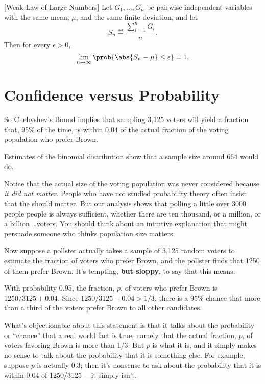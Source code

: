 \begin{corollary}\label{weaklaw}[Weak Law of Large Numbers]
  Let $G_1, \dots, G_n$ be pairwise independent variables with the same
  mean, $\mu$, and the same finite deviation, and let
\[
S_n \eqdef \frac{\sum_{i=1}^n G_i}{n}.
\]
Then for every $\epsilon > 0$,
\[
\lim_{n \rightarrow \infty}
        \prob{\abs{S_n - \mu}  \leq \epsilon} = 1.
\]
\end{corollary}

\section{Confidence versus Probability}

So Chebyshev's Bound implies that sampling 3,125 voters will yield a
fraction that, 95\% of the time, is within 0.04 of the actual fraction
of the voting population who prefer Brown.  \begin{editingnotes}
  Estimates of the binomial distribution show that a sample size
  around 664 would do.
\end{editingnotes}

Notice that the actual size of the voting population was never
considered because \emph{it did not matter}.  People who have not
studied probability theory often insist that the 
should matter.  But our analysis shows that polling a little over 3000
people people is always sufficient, whether there are ten thousand, or
a million, or a billion \dots voters.  You should think about an intuitive
explanation that might persuade someone who thinks population size
matters.

Now suppose a pollster actually takes a sample of 3,125 random voters to
estimate the fraction of voters who prefer Brown, and the pollster finds
that 1250 of them prefer Brown.  It's tempting, \textbf{but sloppy}, to
say that this means:
\begin{falseclm*}
  With probability 0.95, the fraction, $p$, of voters who prefer Brown
  is $1250/3125 \pm 0.04$.  Since $1250/3125 -0.04 > 1/3$, there is a 95\%
  chance that more than a third of the voters prefer Brown to all other
  candidates.
\end{falseclm*}
What's objectionable about this statement is that it talks about the
probability or ``chance'' that a real world fact is true, namely that the
actual fraction, $p$, of voters favoring Brown is more than 1/3.  But $p$
is what it is, and it simply makes no sense to talk about the probability
that it is something else.  For example, suppose $p$ is actually 0.3;
then it's nonsense to ask about the probability that it is within 0.04 of
1250/3125 ---it simply isn't.

